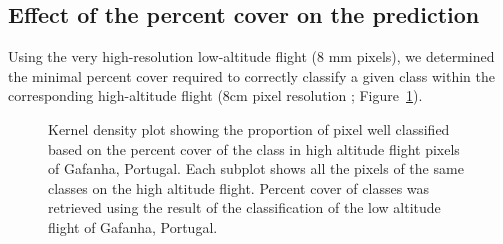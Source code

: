 \documentclass[
  number]{elsarticle}
\begin{document}
\subsection{Effect of the percent cover on the
prediction}\label{effect-of-the-percent-cover-on-the-prediction}

Using the very high-resolution low-altitude flight (8 mm pixels), we
determined the minimal percent cover required to correctly classify a
given class within the corresponding high-altitude flight (8cm pixel
resolution ; Figure~\ref{fig-upscaling}).

\label{cell-fig-upscaling}
\begin{figure}[H]


\caption{\label{fig-upscaling}Kernel density plot showing the proportion
of pixel well classified based on the percent cover of the class in high
altitude flight pixels of Gafanha, Portugal. Each subplot shows all the
pixels of the same classes on the high altitude flight. Percent cover of
classes was retrieved using the result of the classification of the low
altitude flight of Gafanha, Portugal.}

\end{figure}%
\end{document}
